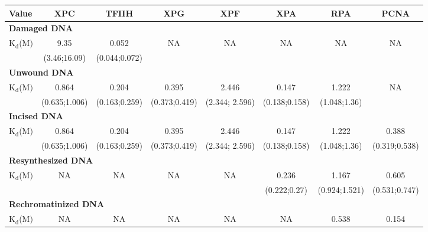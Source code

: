 \begin{table}[t]
	\begin{adjustwidth}{-1 cm}{}
	\scriptsize{
	\begin{tabular}{p{2cm}ccccccc}
	\hline
	\textbf{Value}    & \textbf{ XPC} & \textbf{TFIIH} & \textbf{XPG} & \textbf{XPF} & \textbf{XPA} & \textbf{RPA} & \textbf{PCNA}  \\
	\hline
	\multicolumn{8}{l}{\textbf{Damaged DNA}} \\
	$\text{K}_{\text{d}}$({\textmu}$\text{M})$                                                  & 9.35                & 0.052 & NA &NA&NA&NA&NA     \\
	& (3.46;16.09)     &(0.044;0.072)  &&&&&   \\
	\multicolumn{8}{l}{\textbf{Unwound DNA}} \\
	$\text{K}_{\text{d}}$({\textmu}$\text{M})$                                                  & 0.864                     & 0.204                   & 0.395                 &2.446                 &0.147                    &1.222                    &NA     \\
	& (0.635;1.006)     & (0.163;0.259)             & (0.373;0.419)		&(2.344; 2.596)&(0.138;0.158)     &  (1.048;1.36)  &   \\
	\multicolumn{8}{l}{\textbf{Incised DNA}} \\
	$\text{K}_{\text{d}}$({\textmu}$\text{M})$                                                  & 0.864                     & 0.204                   & 0.395                 &2.446                 &0.147                    &1.222                    &0.388     \\
	& (0.635;1.006)     & (0.163;0.259)             & (0.373;0.419)		&(2.344; 2.596)&(0.138;0.158)     &  (1.048;1.36) 	 & (0.319;0.538)  \\
	\multicolumn{8}{l}{\textbf{Resynthesized DNA}} \\
	$\text{K}_{\text{d}}$({\textmu}$\text{M})$                                                  & NA                          &NA                         & NA                      &NA                      &0.236                   &1.167                    &0.605     \\
	&                               &                              &                           &                          &(0.222;0.27)     &  (0.924;1.521)  & (0.531;0.747)  \\
	\multicolumn{8}{l}{\textbf{Rechromatinized DNA}} \\
	$\text{K}_{\text{d}}$({\textmu}$\text{M})$                                                  & NA                          &NA                         & NA                      &NA                      &NA                         &0.538                    &0.154     \\

\end{tabular}}
\end{adjustwidth}
\end{table}
